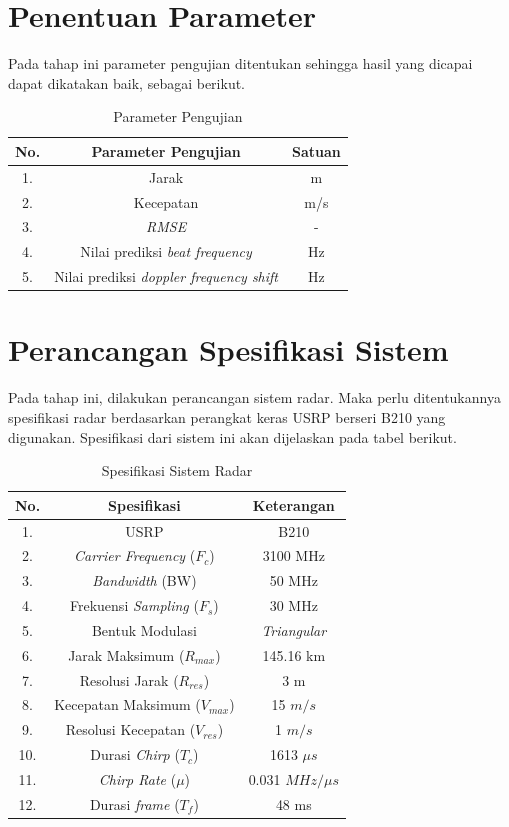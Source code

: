 \section{Penentuan Parameter}

Pada tahap ini parameter pengujian ditentukan sehingga hasil yang dicapai dapat dikatakan baik, sebagai berikut.

\begin{center}
	\begin{longtable}{| c | c | c |}
		\caption{Parameter Pengujian}
		\label{tab:paramUji}\\
		\hline
		No. & Parameter Pengujian		& Satuan\\ \hline
		1.  &Jarak	   					& m\\
		2.  &Kecepatan 					& m/s\\
		3.  &\textit{RMSE}				& -\\
		4.	&Nilai prediksi \textit{beat frequency}	& Hz \\
		5.	&Nilai prediksi \textit{doppler frequency shift} & Hz \\
		\hline
	\end{longtable}
\end{center}

\section{Perancangan Spesifikasi Sistem}
Pada tahap ini, dilakukan perancangan sistem radar. Maka perlu ditentukannya spesifikasi radar berdasarkan perangkat keras USRP berseri B210 yang digunakan.  Spesifikasi dari sistem ini akan dijelaskan pada tabel berikut.

\begin{center}
	\begin{longtable}{| c | c | c |}
		\caption{Spesifikasi Sistem Radar}
		\label{tab:spekRadar}\\
		\hline
		No. & Spesifikasi 								& Keterangan\\\hline
		1.  & USRP 										& B210\\
		2.  & \textit{Carrier Frequency} ($F_{c}$) 		& 3100 MHz \\
		3.  & \textit{Bandwidth} 	(BW)				& 50 MHz \\
		4.	& Frekuensi \textit{Sampling}	($F_{s}$)	& 30 MHz	\\
		5.	& Bentuk Modulasi							& \textit{Triangular}\\
		6.  & Jarak Maksimum 		($R_{max}$)			& 145.16 km \\
		7.  & Resolusi Jarak 		($R_{res}$)			& 3 m \\
		8.  & Kecepatan Maksimum	($V_{max}$)			& 15 $m/s$ \\
		9.  & Resolusi Kecepatan 	($V_{res}$)			& 1 $m/s$\\
		10.	& Durasi \textit{Chirp}	($T_{c}$)			& 1613 $\mu s$\\
		11.	& \textit{Chirp Rate}	($\mu$)				& 0.031 $MHz/\mu s$\\
		12. & Durasi \textit{frame}	($T_{f}$)			& 48 ms \\
		\hline
	\end{longtable}
\end{center}

